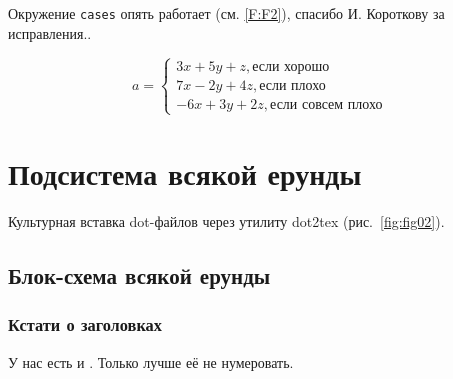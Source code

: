 Окружение \texttt{cases} опять работает (см. \ref{F:F2}), спасибо И. Короткову за исправления..


\begin{equation}
a= \begin{cases}
 3x + 5y + z, \mbox{если хорошо} \\
 7x - 2y + 4z, \mbox{если плохо}\\
 -6x + 3y + 2z, \mbox{если совсем плохо}
\end{cases}
\label{F:F2}
\end{equation}

\section{Подсистема всякой ерунды}

Культурная вставка dot-файлов через утилиту dot2tex (рис.~\ref{fig:fig02}).



\subsection{Блок-схема всякой ерунды}

\subsubsection*{Кстати о заголовках}

У нас есть и . Только лучше её не нумеровать.

